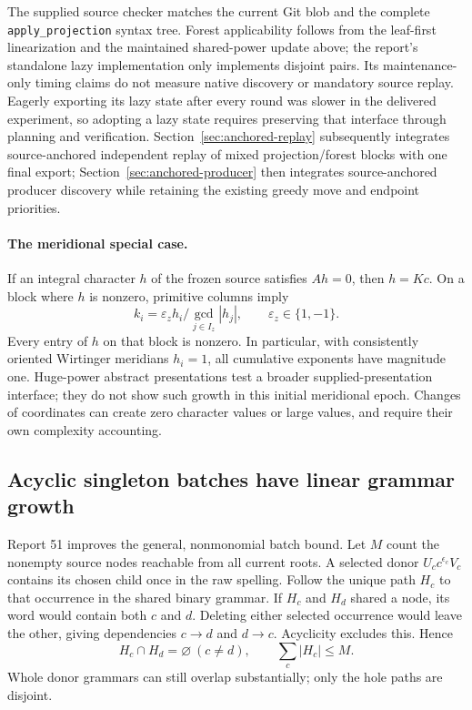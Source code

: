 The supplied source checker matches the current 
Git blob and the complete \texttt{apply\_projection} syntax tree. Forest
applicability follows from the leaf-first linearization and the maintained
shared-power update above; the report's standalone lazy implementation only
implements disjoint pairs. Its maintenance-only timing claims do not measure
native discovery or mandatory source replay. Eagerly exporting its lazy state
after every round was slower in the delivered experiment, so adopting a lazy
state requires preserving that interface through planning and verification.
Section~\ref{sec:anchored-replay} subsequently integrates source-anchored
independent replay of mixed projection/forest blocks with one final export;
Section~\ref{sec:anchored-producer} then integrates source-anchored producer
discovery while retaining the existing greedy move and endpoint priorities.

\paragraph{The meridional special case.}
If an integral character $h$ of the frozen source satisfies $Ah=0$, then
$h=Kc$. On a block where $h$ is nonzero, primitive columns imply
\[
 k_i=\varepsilon_z h_i/\gcd_{j\in I_z}|h_j|,
 \qquad \varepsilon_z\in\{1,-1\}.
\]
Every entry of $h$ on that block is nonzero. In particular, with consistently
oriented Wirtinger meridians $h_i=1$, all cumulative exponents have magnitude
one. Huge-power abstract presentations test a broader supplied-presentation
interface; they do not show such growth in this initial meridional epoch.
Changes of coordinates can create zero character values or large values,
and require their own complexity accounting.

\subsection{Acyclic singleton batches have linear grammar growth}

Report 51 improves the general, nonmonomial batch bound. Let $M$ count the
nonempty source nodes reachable from all current roots. A selected donor
$U_c c^{\epsilon_c}V_c$ contains its chosen child once in the raw spelling.
Follow the unique path $H_c$ to that occurrence in the shared binary grammar.
If $H_c$ and $H_d$ shared a node, its word would contain both $c$ and $d$.
Deleting either selected occurrence would leave the other, giving dependencies
$c\to d$ and $d\to c$. Acyclicity excludes this. Hence
\[
 H_c\cap H_d=\varnothing\ (c\ne d),\qquad \sum_c|H_c|\le M.
\]
Whole donor grammars can still overlap substantially; only the hole paths
are disjoint.

